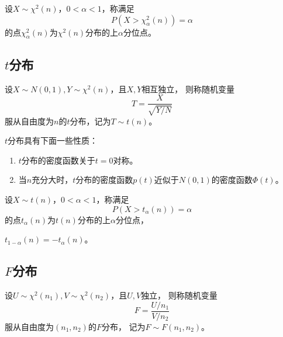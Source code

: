 \begin{definition}
  设$X\sim\chi^2(n)$，$0<\alpha<1$，称满足
  \begin{displaymath}
  P(X>\chi_\alpha^2(n)) = \alpha
  \end{displaymath}
  的点$\chi_\alpha^2(n)$为$\chi^2(n)$分布的上$\alpha$分位点。
\end{definition}

\subsection{$t$分布}
\begin{definition}[$t$分布]
  设$X\sim N(0,1),Y\sim \chi^2(n)$，且$X,Y$相互独立，
  则称随机变量
  \begin{displaymath}
    T=\frac{X}{\sqrt{Y/N}}
  \end{displaymath}
  服从自由度为$n$的$t$分布，记为$T\sim t(n)$。
\end{definition}

\begin{theorem}[$t$分布的性质]
  $t$分布具有下面一些性质：
  \begin{enumerate}
    \item
    $t$分布的密度函数关于$t=0$对称。
    \item
    当$n$充分大时，$t$分布的密度函数$p(t)$近似于$N(0,1)$的密度函数$\Phi(t)$。
  \end{enumerate}
\end{theorem}

\begin{definition}
  设$X\sim t(n)$，$0<\alpha<1$，称满足
  \begin{displaymath}
    P(X>t_\alpha(n)) = \alpha
  \end{displaymath}
  的点$t_\alpha(n)$为$t(n)$分布的上$\alpha$分位点，
\end{definition}

\begin{theorem}
  $t_{1-\alpha}(n) = -t_\alpha(n)$。
\end{theorem}

\subsection{$F$分布}
\begin{definition}[$F$分布]
  设$U\sim\chi^2(n_1), V\sim\chi^2(n_2)$，且$U,V$独立，
  则称随机变量
  \begin{displaymath}
    F = \frac{U/n_1}{V/n_2}
  \end{displaymath}
  服从自由度为$(n_1,n_2)$的$F$分布，
  记为$F\sim F(n_1,n_2)$。
\end{definition}

